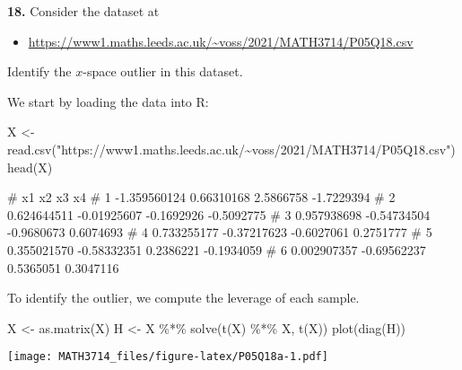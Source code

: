 \documentclass[
  a4paper,
]{article}
\newenvironment{Shaded}{\begin{snugshade}}{\end{snugshade}}
\newcommand{\FunctionTok}[1]{\textcolor[rgb]{0.00,0.00,0.00}{#1}}
\newcommand{\NormalTok}[1]{#1}
\newcommand{\OtherTok}[1]{\textcolor[rgb]{0.56,0.35,0.01}{#1}}
\newcommand{\SpecialCharTok}[1]{\textcolor[rgb]{0.00,0.00,0.00}{#1}}
\newcommand{\StringTok}[1]{\textcolor[rgb]{0.31,0.60,0.02}{#1}}
\providecommand{\tightlist}{%
  \setlength{\itemsep}{0pt}\setlength{\parskip}{0pt}}
\theoremstyle{definition}
\theoremstyle{definition}
\theoremstyle{definition}
\theoremstyle{definition}
\theoremstyle{remark}
\begin{document}
\textbf{18.}
Consider the dataset at

\begin{itemize}
\tightlist
\item
  \url{https://www1.maths.leeds.ac.uk/~voss/2021/MATH3714/P05Q18.csv}
\end{itemize}

Identify the \(x\)-space outlier in this dataset.

\begin{myanswers}
We start by loading the data into R:

\begin{Shaded}
\begin{Highlighting}[]
\NormalTok{X }\OtherTok{\textless{}{-}} \FunctionTok{read.csv}\NormalTok{(}\StringTok{"https://www1.maths.leeds.ac.uk/\textasciitilde{}voss/2021/MATH3714/P05Q18.csv"}\NormalTok{)}
\FunctionTok{head}\NormalTok{(X)}
\end{Highlighting}
\end{Shaded}

\begin{Shaded}
\begin{Highlighting}[]
\NormalTok{\#             x1          x2         x3         x4}
\NormalTok{\# 1 {-}1.359560124  0.66310168  2.5866758 {-}1.7229394}
\NormalTok{\# 2  0.624644511 {-}0.01925607 {-}0.1692926 {-}0.5092775}
\NormalTok{\# 3  0.957938698 {-}0.54734504 {-}0.9680673  0.6074693}
\NormalTok{\# 4  0.733255177 {-}0.37217623 {-}0.6027061  0.2751777}
\NormalTok{\# 5  0.355021570 {-}0.58332351  0.2386221 {-}0.1934059}
\NormalTok{\# 6  0.002907357 {-}0.69562237  0.5365051  0.3047116}
\end{Highlighting}
\end{Shaded}

To identify the outlier, we compute the leverage of each sample.

\begin{Shaded}
\begin{Highlighting}[]
\NormalTok{X }\OtherTok{\textless{}{-}} \FunctionTok{as.matrix}\NormalTok{(X)}
\NormalTok{H }\OtherTok{\textless{}{-}}\NormalTok{ X }\SpecialCharTok{\%*\%} \FunctionTok{solve}\NormalTok{(}\FunctionTok{t}\NormalTok{(X) }\SpecialCharTok{\%*\%}\NormalTok{ X, }\FunctionTok{t}\NormalTok{(X))}
\FunctionTok{plot}\NormalTok{(}\FunctionTok{diag}\NormalTok{(H))}
\end{Highlighting}
\end{Shaded}

\texttt{[image: MATH3714\_files/figure-latex/P05Q18a-1.pdf]}


\end{myanswers}
\end{document}
